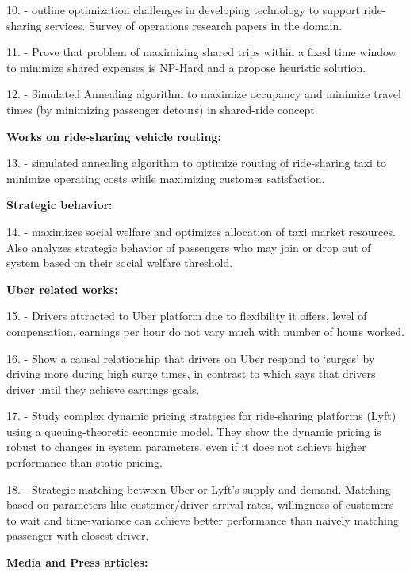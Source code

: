 10. \citeauthor{agatz2012optimization} - outline optimization challenges in developing technology to support ride-sharing services. Survey of operations research papers in the domain.

11. \citeauthor{santos2013dynamic} - Prove that problem of maximizing shared trips within a fixed time window to minimize shared expenses is NP-Hard and a propose heuristic solution.

12. \citeauthor{jung2013design} - Simulated Annealing algorithm to maximize occupancy and minimize travel times (by minimizing passenger detours) in shared-ride concept.

\textbf{Works on ride-sharing vehicle routing:}

13. \citeauthor{lin2012research} - simulated annealing algorithm to optimize routing of ride-sharing taxi to minimize operating costs while maximizing customer satisfaction.

\textbf{Strategic behavior:}

14. \citeauthor{shi2016optimization} - maximizes social welfare and optimizes allocation of taxi market resources. Also analyzes strategic behavior of passengers who may join or drop out of system based on their social welfare threshold.

\textbf{Uber related works:}

15. \citeauthor{hall2016analysis} - Drivers attracted to Uber platform due to flexibility it offers, level of compensation, earnings per hour do not vary much with number of hours worked. 

16. \citeauthor{chen2016dynamic} - Show a causal relationship that drivers on Uber respond to `surges' by driving more during high surge times, in contrast to \citeauthor{camerer1997labor} which says that drivers driver until they achieve earnings goals.

17. \citeauthor{banerjee2015pricing} - Study complex dynamic pricing strategies for ride-sharing platforms (Lyft) using a queuing-theoretic economic model. They show the dynamic pricing is robust to changes in system parameters, even if it does not achieve higher performance than static pricing. 

18. \citeauthor{ozkan2016dynamic} - Strategic matching between Uber or Lyft's supply and demand. Matching based on parameters like customer/driver arrival rates, willingness of customers to wait and time-variance can achieve better performance than naively matching passenger with closest driver.

\textbf{Media and Press articles:}

